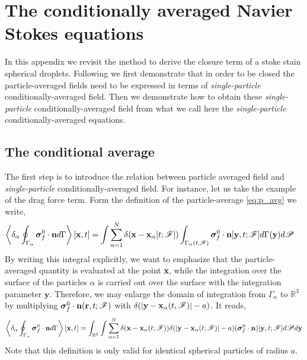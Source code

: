 \section{The conditionally averaged Navier Stokes equations}
\label{ap:conditionally_navier_stokes}

In this appendix we revisit the method to derive the closure term of a stoke stain spherical droplets. 
Following \citet{zhang1994ensemble} we first demonstrate that in order to be closed the particle-averaged  fields need to be expressed in terms of \textit{single-particle} conditionally-averaged field. 
Then we demonstrate how to obtain these \textit{single-particle} conditionally-averaged field from what we call here the \textit{single-particle} conditionally-averaged equations. 

\subsection{The conditional average}
The first step is to introduce the relation between particle averaged field and \textit{single-particle} conditionally-averaged field.
For instance, let us take the example of the drag force term. 
Form the definition of the particle-average \ref{eq:p_avg} we write,
\begin{align}
    \left<\delta_\alpha \oint_{\Gamma_\alpha} \bm\sigma_f^0\cdot\textbf{n} d\Gamma\right>[\textbf{x},t]
    &= \int \sum_{\alpha=1}^N \delta(\textbf{x}-\textbf{x}_\alpha[t; \mathscr{F}])
    \int_{\Gamma_\alpha(t,\mathscr{F})}
    \bm\sigma_f^0\cdot\textbf{n}[\textbf{y},t;\mathscr{F}]
    d\Gamma(\textbf{y}) d\mathscr{P}
\end{align}
By writing this integral explicitly, we want to emphasize that the particle-averaged quantity is evaluated at the point \textbf{x}, while the integration over the surface of the particles $\alpha$ is carried out over the surface with the integration parameter $\textbf{y}$.
Therefore, we may enlarge the domain of integration from $\Gamma_\alpha$ to $\mathbb{R}^3$ by multiplying $\bm\sigma_f^0\cdot\textbf{n}(\textbf{r},t;\mathscr{F})$ with $\delta(|\textbf{y} - \textbf{x}_\alpha(t,\mathscr{F})| - a)$. 
It reads, 
\begin{equation}
    \left<\delta_\alpha \oint_{\Gamma_\alpha} \bm\sigma_f^0\cdot\textbf{n} d\Gamma\right>[\textbf{x},t]
    = 
    \int_{\mathbb{R}^3}
    \int
     \sum_{\alpha=1}^N 
     \delta(\textbf{x}-\textbf{x}_\alpha(t; \mathscr{F}))
    \delta(|\textbf{y} - \textbf{x}_{\alpha}(t;\mathscr{F})|-a)
    (\bm\sigma_f^0\cdot\textbf{n})[\textbf{y},t;\mathscr{F}]
    d\mathscr{P}
    d\textbf{y}
\end{equation}
Note that this definition is only valid for identical spherical particles of radius $a$. 
